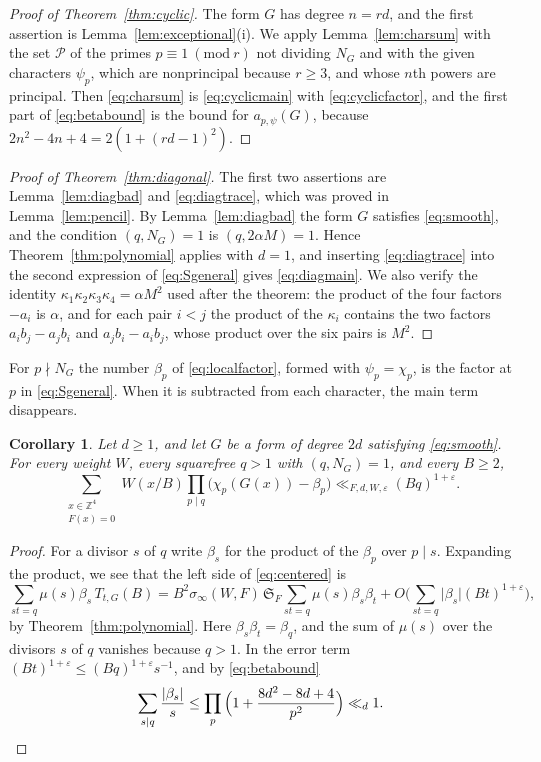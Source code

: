 \documentclass[11pt]{amsart}
\numberwithin{equation}{section}
\numberwithin{figure}{section}
\newtheorem{corollary}[lemma]{Corollary}
\theoremstyle{definition}
\newcommand{\Z}{\mathbb{Z}}
\newcommand{\F}{\mathcal{F}}
\newcommand{\imod}[1]{\ (\mathrm{mod}\ #1)}
\renewcommand{\S}{\mathfrak{S}}
\newcommand{\eps}{\varepsilon}
\newcommand{\abs}[1]{\lvert #1\rvert}
\begin{document}
\begin{proof}[Proof of Theorem~\ref{thm:cyclic}]
The form $G$ has degree $n=rd$, and the first assertion is
Lemma~\ref{lem:exceptional}(i). We apply Lemma~\ref{lem:charsum} with
the set $\mathcal P$ of the primes $p\equiv1\imod r$ not dividing
$N_G$ and with the given characters $\psi_p$, which are nonprincipal
because $r\ge3$, and whose $n$th powers are principal. Then
\eqref{eq:charsum} is \eqref{eq:cyclicmain} with
\eqref{eq:cyclicfactor}, and the first part of \eqref{eq:betabound}
is the bound for $a_{p,\psi}(G)$, because
$2n^2-4n+4=2(1+(rd-1)^2)$.
\end{proof}

\begin{proof}[Proof of Theorem~\ref{thm:diagonal}]
The first two assertions are Lemma~\ref{lem:diagbad} and
\eqref{eq:diagtrace}, which was proved in Lemma~\ref{lem:pencil}. By
Lemma~\ref{lem:diagbad} the form $G$ satisfies \eqref{eq:smooth},
and the condition $(q,N_G)=1$ is $(q,2\alpha M)=1$. Hence
Theorem~\ref{thm:polynomial} applies with $d=1$, and inserting
\eqref{eq:diagtrace} into the second expression of
\eqref{eq:Sgeneral} gives \eqref{eq:diagmain}. We also verify the
identity $\kappa_1\kappa_2\kappa_3\kappa_4=\alpha M^2$ used after the
theorem: the product of the four factors $-a_i$ is $\alpha$, and for
each pair $i<j$ the product of the $\kappa_i$ contains the two
factors $a_ib_j-a_jb_i$ and $a_jb_i-a_ib_j$, whose product over the
six pairs is $M^2$.
\end{proof}

For $p\nmid N_G$ the number $\beta_p$ of \eqref{eq:localfactor},
formed with $\psi_p=\chi_p$, is the factor at $p$ in
\eqref{eq:Sgeneral}. When it is subtracted from each character, the
main term disappears.

\begin{corollary}\label{cor:centered}
Let $d\ge1$, and let $G$ be a form of degree $2d$ satisfying
\eqref{eq:smooth}. For every weight $W$, every squarefree $q>1$ with
$(q,N_G)=1$, and every $B\ge2$,
\begin{equation}\label{eq:centered}
 \sum_{\substack{x\in\Z^4\\F(x)=0}}W(x/B)
 \prod_{p\mid q}\big(\chi_p(G(x))-\beta_p\big)
 \ll_{F,d,W,\eps}(Bq)^{1+\eps}.
\end{equation}
\end{corollary}

\begin{proof}
For a divisor $s$ of $q$ write $\beta_s$ for the product of the
$\beta_p$ over $p\mid s$. Expanding the product, we see that the left
side of \eqref{eq:centered} is
\[
 \sum_{st=q}\mu(s)\beta_s\,T_{t,G}(B)
 =B^2\sigma_\infty(W,F)\,\S_F\sum_{st=q}\mu(s)\beta_s\beta_t
 +O\bigg(\sum_{st=q}\abs{\beta_s}(Bt)^{1+\eps}\bigg),
\]
by Theorem~\ref{thm:polynomial}. Here $\beta_s\beta_t=\beta_q$, and
the sum of $\mu(s)$ over the divisors $s$ of $q$ vanishes because
$q>1$. In the error term $(Bt)^{1+\eps}\le(Bq)^{1+\eps}s^{-1}$, and
by \eqref{eq:betabound}
\[
 \sum_{s\mid q}\frac{\abs{\beta_s}}s
 \le\prod_p\Big(1+\frac{8d^2-8d+4}{p^2}\Big)\ll_d1.\qedhere
\]
\end{proof}
\end{document}
